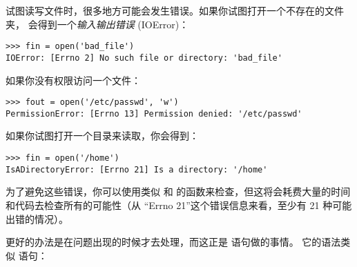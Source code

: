 {{{{{{{%

试图读写文件时，很多地方可能会发生错误。如果你试图打开一个不存在的文件夹，
会得到一个{\em 输入输出错误} (IOError)：

  
  

\begin{lstlisting}
>>> fin = open('bad_file')
IOError: [Errno 2] No such file or directory: 'bad_file'
\end{lstlisting}

%

如果你没有权限访问一个文件：

  

\begin{lstlisting}
>>> fout = open('/etc/passwd', 'w')
PermissionError: [Errno 13] Permission denied: '/etc/passwd'
\end{lstlisting}

%

如果你试图打开一个目录来读取，你会得到：

\begin{lstlisting}
>>> fin = open('/home')
IsADirectoryError: [Errno 21] Is a directory: '/home'
\end{lstlisting}

%

为了避免这些错误，你可以使用类似  和  的函数来检查，但这将会耗费大量的时间和代码去检查所有的可能性（从 ``Errno 21''这个错误信息来看，至少有 21 种可能出错的情况）。

  


更好的办法是在问题出现的时候才去处理，而这正是  语句做的事情。
它的语法类似  语句：

}}}}}}}
